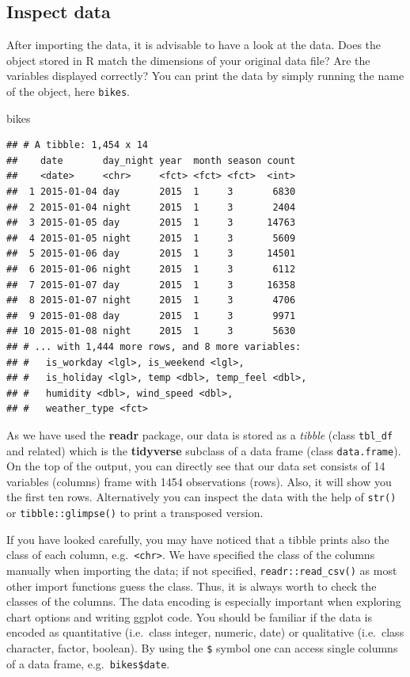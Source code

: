 \documentclass[
]{krantz}
\makeatletter
\newenvironment{Shaded}{\begin{snugshade}}{\end{snugshade}}
\newcommand{\NormalTok}[1]{#1}
\newenvironment{kframe}{%
\medskip{}
\setlength{\fboxsep}{.8em}
 \def\at@end@of@kframe{}%
 \ifinner\ifhmode%
  \def\at@end@of@kframe{\end{minipage}}%
  \begin{minipage}{\columnwidth}%
 \fi\fi%
 \def\FrameCommand##1{\hskip\@totalleftmargin \hskip-\fboxsep
 \colorbox{shadecolor}{##1}\hskip-\fboxsep
     \hskip-\linewidth \hskip-\@totalleftmargin \hskip\columnwidth}%
 \MakeFramed {\advance\hsize-\width
   \@totalleftmargin\z@ \linewidth\hsize
   \@setminipage}}%
 {\par\unskip\endMakeFramed%
 \at@end@of@kframe}
\renewenvironment{Shaded}{\begin{kframe}}{\end{kframe}}
\makeatother
\begin{document}
\hypertarget{inspect-data}{%
\subsection{Inspect data}\label{inspect-data}}

After importing the data, it is advisable to have a look at the data. Does the object stored in R match the dimensions of your original data file? Are the variables displayed correctly? You can print the data by simply running the name of the object, here \texttt{bikes}.

\begin{Shaded}
\begin{Highlighting}[]
\NormalTok{bikes}
\end{Highlighting}
\end{Shaded}

\begin{verbatim}
## # A tibble: 1,454 x 14
##    date       day_night year  month season count
##    <date>     <chr>     <fct> <fct> <fct>  <int>
##  1 2015-01-04 day       2015  1     3       6830
##  2 2015-01-04 night     2015  1     3       2404
##  3 2015-01-05 day       2015  1     3      14763
##  4 2015-01-05 night     2015  1     3       5609
##  5 2015-01-06 day       2015  1     3      14501
##  6 2015-01-06 night     2015  1     3       6112
##  7 2015-01-07 day       2015  1     3      16358
##  8 2015-01-07 night     2015  1     3       4706
##  9 2015-01-08 day       2015  1     3       9971
## 10 2015-01-08 night     2015  1     3       5630
## # ... with 1,444 more rows, and 8 more variables:
## #   is_workday <lgl>, is_weekend <lgl>,
## #   is_holiday <lgl>, temp <dbl>, temp_feel <dbl>,
## #   humidity <dbl>, wind_speed <dbl>,
## #   weather_type <fct>
\end{verbatim}

As we have used the \textbf{readr} package, our data is stored as a \emph{tibble} (class \texttt{tbl\_df} and related) which is the \textbf{tidyverse} subclass of a data frame (class \texttt{data.frame}). On the top of the output, you can directly see that our data set consists of 14 variables (columns) frame with 1454 observations (rows). Also, it will show you the first ten rows. Alternatively you can inspect the data with the help of \texttt{str()} or \texttt{tibble::glimpse()} to print a transposed version.

If you have looked carefully, you may have noticed that a tibble prints also the class of each column, e.g.~\texttt{\textless{}chr\textgreater{}}. We have specified the class of the columns manually when importing the data; if not specified, \texttt{readr::read\_csv()} as most other import functions guess the class. Thus, it is always worth to check the classes of the columns. The data encoding is especially important when exploring chart options and writing ggplot code. You should be familiar if the data is encoded as quantitative (i.e.~class integer, numeric, date) or qualitative (i.e.~class character, factor, boolean). By using the \texttt{\$} symbol one can access single columns of a data frame, e.g.~\texttt{bikes\$date}.
\end{document}
